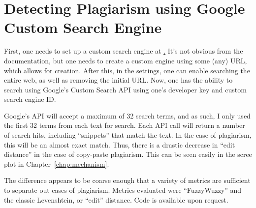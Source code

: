 \chapter{Detecting Plagiarism using Google Custom Search Engine}
\label{app:detecting-plagiarism}


First, one needs to set up a custom search engine at
\href{http://www.google.com/cse}. It's not obvious from the documentation, but
one needs to create a custom engine using some (any) URL, which allows for
creation. After this, in the settings, one can enable searching the entire web,
as well as removing the initial URL. Now, one has the ability to search using
Google's Custom Search API using one's developer key and custom search engine
ID.

Google's API will accept a maximum of 32 search terms, and as such, I only used
the first 32 terms from each text for search. Each API call will return a number
of search hits, including “snippets” that match the text. In the case of
plagiarism, this will be an almost exact match. Thus, there is a drastic
decrease in “edit distance” in the case of copy-paste plagiarism. This can be
seen easily in the scree plot in Chapter~\ref{chap:mechanism}.

The difference appears to be coarse enough that a variety of metrics are
sufficient to separate out cases of plagiarism. Metrics evaluated were
“FuzzyWuzzy” and the classic Levenshtein, or “edit” distance. Code is available
upon request.
